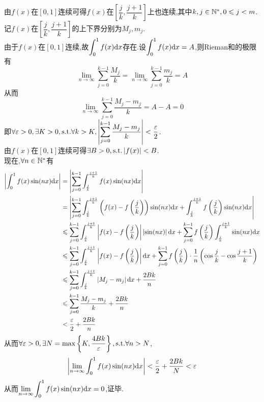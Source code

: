 \documentclass{ctexart}
\begin{document}
\begin{solution}[Proof.]
    由$f(x)$在$[0,1]$连续可得$f(x)$在$\left[\dfrac{j}{k},\dfrac{j+1}{k}\right]$上也连续,其中$k,j\in\mathbb{N}^*,0\leqslant j<m$.\\
    记$f(x)$在$\left[\dfrac{j}{k},\dfrac{j+1}{k}\right]$的上下界分别为$M_j,m_j$.\\
    由于$f(x)$在$[0,1]$连续,故$\displaystyle\int_{0}^{1}{f(x)\mathrm{d} x}$存在.设$\displaystyle\int_{0}^{1}{f(x)\mathrm{d} x}=A$,则Rieman和的极限有
    $$\lim_{n\to\infty}{\sum_{j=0}^{k-1}{\dfrac{M_j}{k}}}=\lim_{n\to\infty}{\sum_{j=0}^{k-1}{\dfrac{m_j}{k}}}=A$$
    从而$$\lim_{n\to\infty}{\sum_{j=0}^{k-1}{\dfrac{M_j-m_j}{k}}}=A-A=0$$
    即$\displaystyle\forall\varepsilon>0,\exists K>0,\text{s.t.}\forall k>K,\left|\sum_{j=0}^{k-1}{\dfrac{M_j-m_j}{k}}\right|<\dfrac{\varepsilon}{2}$.\\
    由$f(x)$在$[0,1]$连续可得$\exists B>0,\text{s.t.}\left|f(x)\right|<B$.\\
    现在,$\forall n\in\mathbb{N}^*$有
    \begin{align*}
        \left|\int_{0}^{1}{f(x)\sin(nx)\mathrm{d} x}\right|
        &= \left|\sum_{j=0}^{k-1}{\int_{\frac{j}{k}}^{\frac{j+1}{k}}{f(x)\sin(nx)\mathrm{d} x}}\right| \\
        &= \left|\sum_{j=0}^{k-1}{\int_{\frac{j}{k}}^{\frac{j+1}{k}}{\left(f(x)-f\left(\dfrac{j}{k}\right)\right)\sin(nx)\mathrm{d} x}}+\int_{\frac{j}{k}}^{\frac{j+1}{k}}{f\left(\dfrac{j}{k}\right)\sin(nx)\mathrm{d} x}\right| \\
        &\leqslant \sum_{j=0}^{k-1}{\int_{\frac{j}{k}}^{\frac{j+1}{k}}{\left|f(x)-f\left(\dfrac{j}{k}\right)\right|\left|\sin(nx)\right|\mathrm{d} x}}+\sum_{j=0}^{k-1}{f\left(\dfrac{j}{k}\right)\int_{\frac{j}{k}}^{\frac{j+1}{k}}{\sin(nx)\mathrm{d} x}} \\
        &\leqslant \sum_{j=0}^{k-1}{\int_{\frac{j}{k}}^{\frac{j+1}{k}}{\left|f(x)-f\left(\dfrac{j}{k}\right)\right|\mathrm{d} x}}+\sum_{j=0}^{k-1}{f\left(\dfrac{j}{k}\right)\cdot\dfrac{1}{n}\left(\cos{\dfrac{j}{k}}-\cos{\dfrac{j+1}{k}}\right)} \\
        &\leqslant \sum_{j=0}^{k-1}{\int_{\frac{j}{k}}^{\frac{j+1}{k}}{\left|M_j-m_j\right|\mathrm{d} x}}+\dfrac{2Bk}{n} \\
        &\leqslant \sum_{j=0}^{k-1}{\dfrac{M_j-m_j}{k}}+\dfrac{2Bk}{n} \\
        &< \dfrac{\varepsilon}{2}+\dfrac{2Bk}{n}
    \end{align*}
    从而$\forall\varepsilon>0,\exists N=\max\left\{K,\dfrac{4Bk}{\varepsilon}\right\},\text{s.t.}\forall n>N$,
    $$\left|\lim_{n\to\infty}{\int_{0}^{1}{f(x)\sin(nx)\mathrm{d} x}}\right|<\dfrac{\varepsilon}{2}+\dfrac{2Bk}{N}<\varepsilon$$
    从而$\displaystyle\lim_{n\to\infty}{\int_{0}^{1}{f(x)\sin(nx)\mathrm{d} x}}=0$,证毕.
\end{solution}
\end{document}
